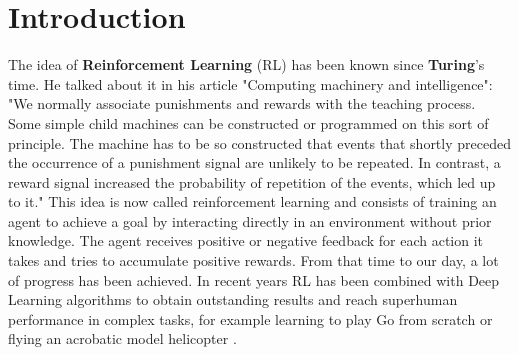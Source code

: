 

\chapter{Introduction} %

\label{Chapter1} %
The idea of \textbf{Reinforcement Learning} (RL) has been known since \textbf{Turing}'s time.
He talked about it in his article "Computing machinery and intelligence":
"We normally associate punishments and rewards with the teaching process. 
Some simple child machines can be constructed or programmed on this sort of principle. 
The machine has to be so constructed that events that shortly preceded the occurrence of a punishment signal are unlikely to be repeated. In contrast, a reward signal increased the probability of repetition of the events, which led up to it.\cite{turing2009computing}"
This idea is now called reinforcement learning and consists of training an agent to achieve a goal by interacting directly in an environment without prior knowledge. The agent receives positive or negative feedback for each action it takes and tries to accumulate positive rewards.
From that time to our day, a lot of progress has been achieved.
In recent years RL has been combined with Deep Learning algorithms to obtain outstanding results and reach superhuman performance in complex tasks, for example learning to play Go from scratch \cite{silver2016mastering} or flying an acrobatic model helicopter \cite{abbeel2007application}.\\

